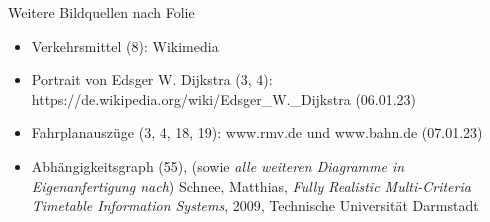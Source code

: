 \documentclass[
	ngerman,
	aspectratio=43,
	color={accentcolor=11c},
	logo=false,
	colorframetitle=false,
	]{tudabeamer}
\begin{document}
\begin{frame}{Weitere Bildquellen nach Folie}
	\begin{itemize}
		\item Verkehrsmittel (8): Wikimedia
		\item Portrait von Edsger W. Dijkstra (3, 4): https://de.wikipedia.org/wiki/Edsger\_W.\_Dijkstra (06.01.23)
		\item Fahrplanauszüge (3, 4, 18, 19): www.rmv.de und www.bahn.de (07.01.23)
		\item Abhängigkeitsgraph (55), (sowie \textit{alle weiteren Diagramme in Eigenanfertigung nach}) Schnee, Matthias, \textit{Fully Realistic Multi-Criteria Timetable Information Systems}, 2009, Technische Universität Darmstadt
	\end{itemize}
\end{frame}
\end{document}
